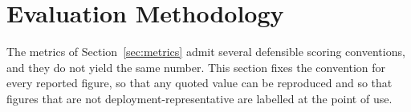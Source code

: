 \documentclass[12pt, a4paper]{report}
\begin{document}
{{%

\section{Evaluation Methodology}
\label{sec:eval_methodology}

The metrics of Section~\ref{sec:metrics} admit several defensible
scoring conventions, and they do not yield the same number. This
section fixes the convention for every reported figure, so that any
quoted value can be reproduced and so that figures that are not
deployment-representative are labelled at the point of use.

}}
\end{document}

